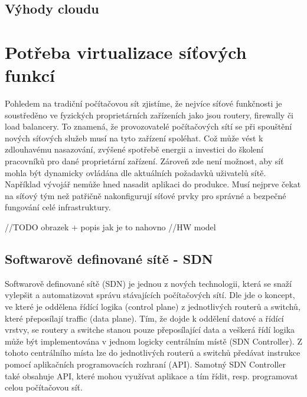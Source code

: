 \subsection{Výhody cloudu}

\section{Potřeba virtualizace síťových funkcí}

Pohledem na tradiční počítačovou sít zjistíme, že nejvíce síťové funkčnosti je soustředěno ve fyzických proprietárních zařízeních jako jsou routery, firewally či load balancery. To znamená, že provozovatelé počítačových sítí se při spouštění nových síťových služeb musí na tyto zařízení spoléhat. Což může vést k zdlouhavému nasazování, zvýšené spotřebě energii a investici do školení pracovníků pro dané proprietární zařízení. Zároveň zde není možnost, aby síť mohla být dynamicky ovládána dle aktuálních požadavků uživatelů sítě. Například vývojář nemůže hned nasadit aplikaci do produkce. Musí nejprve čekat na síťový tým než patřičně nakonfigurují síťové prvky pro správné a bezpečné fungování celé infrastruktury.

//TODO obrazek + popis jak je to nahovno
//HW model 

\subsection{Softwarově definované sítě - SDN}

Softwarově definované sítě (SDN) je jednou z nových technologii, která se snaží vylepšit a automatizovat správu stávajících počítačových sítí. Dle \cite{SDN_clanek} jde o koncept, ve které je oddělena řídící logika (control plane) z jednotlivých routerů a switchů, které přeposílají traffic (data plane). Tím, že dojde k oddělení datové a řídící vrstvy, se routery a switche stanou pouze přeposílající data a veškerá řídí logika může být implementována v jednom logicky centrálním místě (SDN Controller). Z tohoto centrálního místa lze do jednotlivých routerů a switchů předávat instrukce pomocí aplikačních programovacích rozhraní (API). Samotný SDN Controller také obsahuje API, které mohou využívat aplikace a tím řídit, resp. programovat celou počítačovou síť.

